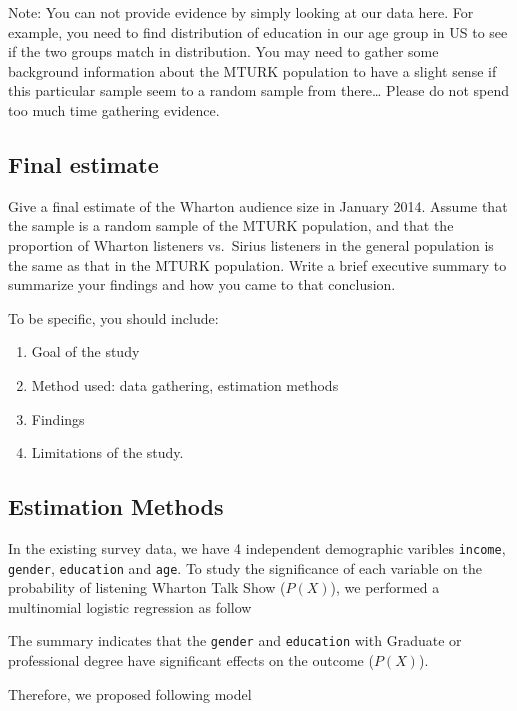 \documentclass[
]{article}
\providecommand{\tightlist}{%
  \setlength{\itemsep}{0pt}\setlength{\parskip}{0pt}}
\begin{document}
Note: You can not provide evidence by simply looking at our data here.
For example, you need to find distribution of education in our age group
in US to see if the two groups match in distribution. You may need to
gather some background information about the MTURK population to have a
slight sense if this particular sample seem to a random sample from
there\ldots{} Please do not spend too much time gathering evidence.

\hypertarget{final-estimate}{%
\subsection{Final estimate}\label{final-estimate}}

Give a final estimate of the Wharton audience size in January 2014.
Assume that the sample is a random sample of the MTURK population, and
that the proportion of Wharton listeners vs.~Sirius listeners in the
general population is the same as that in the MTURK population. Write a
brief executive summary to summarize your findings and how you came to
that conclusion.

To be specific, you should include:

\begin{enumerate}
\def\labelenumi{\arabic{enumi}.}
\tightlist
\item
  Goal of the study
\item
  Method used: data gathering, estimation methods
\item
  Findings
\item
  Limitations of the study.
\end{enumerate}

\hypertarget{estimation-methods}{%
\subsection{Estimation Methods}\label{estimation-methods}}

In the existing survey data, we have 4 independent demographic varibles
\texttt{income}, \texttt{gender}, \texttt{education} and \texttt{age}.
To study the significance of each variable on the probability of
listening Wharton Talk Show (\(P(X)\)), we performed a multinomial
logistic regression as follow

The summary indicates that the \texttt{gender} and \texttt{education}
with Graduate or professional degree have significant effects on the
outcome (\(P(X)\)).

Therefore, we proposed following model
\end{document}
